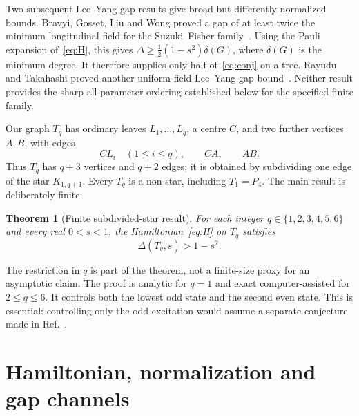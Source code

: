 \documentclass[11pt]{article}
\newtheorem{theorem}{Theorem}
\begin{document}
Two subsequent Lee--Yang gap results give broad but differently normalized
bounds.  Bravyi, Gosset, Liu and Wong proved a gap of at least twice the
minimum longitudinal field for the Suzuki--Fisher family~\cite{bravyi2026}.
Using the Pauli expansion of~\eqref{eq:H}, this gives
\(\Delta\geq \tfrac12(1-s^2)\delta(G)\), where \(\delta(G)\) is the
minimum degree.  It therefore supplies only half of~\eqref{eq:conj} on a
tree.  Rayudu and Takahashi proved another uniform-field Lee--Yang gap
bound~\cite{rayudu2026}.  Neither result provides the sharp all-parameter
ordering established below for the specified finite family.

Our graph \(T_q\) has ordinary leaves \(L_1,\ldots,L_q\), a centre \(C\),
and two further vertices \(A,B\), with edges
\begin{equation}
  CL_i\quad(1\leq i\leq q),\qquad CA,\qquad AB.          \label{eq:Tq}
\end{equation}
Thus \(T_q\) has \(q+3\) vertices and \(q+2\) edges; it is obtained by
subdividing one edge of the star \(K_{1,q+1}\).  Every \(T_q\) is a
non-star, including \(T_1=P_4\).  The main result is deliberately finite.

\begin{theorem}[Finite subdivided-star result]             \label{thm:main}
For each integer \(q\in\{1,2,3,4,5,6\}\) and every real
\(0<s<1\), the Hamiltonian~\eqref{eq:H} on \(T_q\) satisfies
\begin{equation}
             \Delta(T_q,s)>1-s^2.                        \label{eq:main}
\end{equation}
\end{theorem}

The restriction in \(q\) is part of the theorem, not a finite-size proxy
for an asymptotic claim.  The proof is analytic for \(q=1\) and exact
computer-assisted for \(2\leq q\leq6\).  It controls both the lowest odd
state and the second even state.  This is essential: controlling only the
odd excitation would assume a separate conjecture made in
Ref.~\cite{wong2026}.

\section{Hamiltonian, normalization and gap channels}
\end{document}
